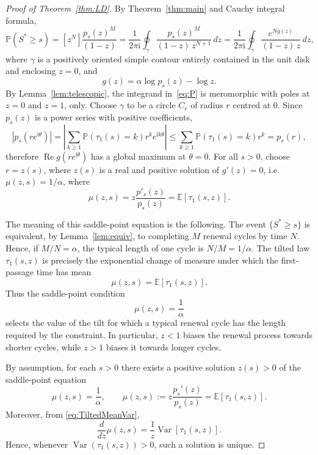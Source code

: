\documentclass[10pt,a4paper]{amsart}
\def\EE{{\mathbb E}}
\def\PR{\mathbb{P}}
\begin{document}
\begin{proof}[{Proof of Theorem~\ref{thm:LD}}] 


{By Theorem~\ref{thm:main}} and Cauchy integral formula,
\begin{equation}\label{eq:P}
\PR(S^*\ge s)
  = [z^N] \frac{p_s(z)^M}{(1-z)}=\frac{1}{2\pi \mathrm{i}}\oint_{\gamma}
  \frac{p_s(z)^M}{(1-z)\,z^{N+1}}\,dz= \frac{1}{2\pi \mathrm{i}}\oint_{\gamma}
  \frac{e^{Ng(z)}}{(1{-}z)\,z}\,dz ,
\end{equation}
where $\gamma$ is a positively oriented simple contour  entirely contained in the unit disk and enclosing $z=0$, and 
\begin{equation}
    g(z)=\alpha\log p_s(z)-\log z.
\end{equation} 
By Lemma~\ref{lem:telescopic}, the integrand in~\eqref{eq:P} is meromorphic with poles at $z=0$ and $z=1$, only. 
Choose $\gamma$ to be a circle $C_r$ of radius $r$ centred at $0$. 
Since  $p_s(z)$ is a power series with positive coefficients, 
\begin{equation}
    |p_s(r e^{\mathrm{i} \theta})|=\left|\sum_{k\geq1} \mathbb{P}(\tau_1(s)=k){r^k e^{\mathrm{i}k\theta}}\right|\leq\sum_{k\geq1} \mathbb{P}(\tau_1(s)=k){r^k} =p_s(r),
\end{equation}
therefore
$\operatorname{Re}g(r{e^{\mathrm{i}\theta}})
$ has a global maximum at $\theta=0$.
For all $s>0$, choose $r=z(s)$, where $z(s)$ is a real and positive solution of $g'(z)=0$, i.e. $ \mu(z,s)=1/\alpha$, where $$\mu(z,s)=z \frac{p'_s(z)}{p_s(z)}=\EE [\tau_1(s,z)] .$$

The meaning of this saddle-point equation is the following.  The event
$\{S^*\geq s\}$ is equivalent, by Lemma~\ref{lem:equiv}, to completing $M$
renewal cycles by time $N$.  Hence, if $M/N=\alpha$, the
typical length of one cycle is $N/M=1/\alpha$.  The tilted law
$\tau_1(s,z)$ is precisely the exponential change of measure under which the
first-passage time has mean
\begin{equation}
    \mu(z,s)=\EE[\tau_1(s,z)] .
\end{equation}
Thus the saddle-point condition
\begin{equation}
    \mu(z,s)=\frac{1}{\alpha}
\end{equation}
selects the value of the tilt for which a typical renewal cycle has the length
required by the constraint.  In particular, $z<1$ biases the renewal process
towards shorter cycles, while $z>1$ biases it towards longer cycles.

By assumption, for each $s>0$ there exists a positive
solution $z(s)>0$ of the saddle-point equation
\begin{equation}
    \mu(z,s)=\frac{1}{\alpha},
    \qquad
    \mu(z,s):=
    z\frac{p_s'(z)}{p_s(z)}
    =
    \EE[\tau_1(s,z)] .
\end{equation}
Moreover, from \eqref{eq:TiltedMeanVar},
\begin{equation}
    \frac{d}{dz}\mu(z,s)
    =
    \frac{1}{z}\operatorname{Var}[\tau_1(s,z)].
\end{equation}
Hence, whenever $\operatorname{Var}(\tau_1(s,z))>0$, such a solution is unique.


\end{proof}
\end{document}

